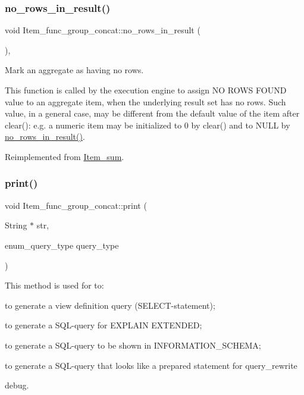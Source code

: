 \subsubsection{\texorpdfstring{no\+\_\+rows\+\_\+in\+\_\+result()}{no\_rows\_in\_result()}}
{\footnotesize\ttfamily void Item\+\_\+func\+\_\+group\+\_\+concat\+::no\+\_\+rows\+\_\+in\+\_\+result (\begin{DoxyParamCaption}{ }\end{DoxyParamCaption})\hspace{0.3cm}{\ttfamily [inline]}, {\ttfamily [virtual]}}

Mark an aggregate as having no rows.

This function is called by the execution engine to assign \textquotesingle{}NO R\+O\+WS F\+O\+U\+ND\textquotesingle{} value to an aggregate item, when the underlying result set has no rows. Such value, in a general case, may be different from the default value of the item after \textquotesingle{}clear()\textquotesingle{}\+: e.\+g. a numeric item may be initialized to 0 by clear() and to N\+U\+LL by \mbox{\hyperlink{classItem__func__group__concat_a89dcd722bccaa2c1b16d972ce823087f}{no\+\_\+rows\+\_\+in\+\_\+result()}}. 

Reimplemented from \mbox{\hyperlink{classItem__sum_aba62f301a61ca3e686abf23e109bb0a8}{Item\+\_\+sum}}.

\mbox{\label{classItem__func__group__concat_aec51f14b9c22c61d5ac4e58add30365b}} 
\subsubsection{\texorpdfstring{print()}{print()}}
{\footnotesize\ttfamily void Item\+\_\+func\+\_\+group\+\_\+concat\+::print (\begin{DoxyParamCaption}\item[{String $\ast$}]{str,  }\item[{enum\+\_\+query\+\_\+type}]{query\+\_\+type }\end{DoxyParamCaption})\hspace{0.3cm}{\ttfamily [virtual]}}

This method is used for to\+:
\begin{DoxyItemize}
\item to generate a view definition query (S\+E\+L\+E\+CT-\/statement);
\item to generate a S\+QL-\/query for E\+X\+P\+L\+A\+IN E\+X\+T\+E\+N\+D\+ED;
\item to generate a S\+QL-\/query to be shown in I\+N\+F\+O\+R\+M\+A\+T\+I\+O\+N\+\_\+\+S\+C\+H\+E\+MA;
\item to generate a S\+QL-\/query that looks like a prepared statement for query\+\_\+rewrite
\item debug.
\end{DoxyItemize}

